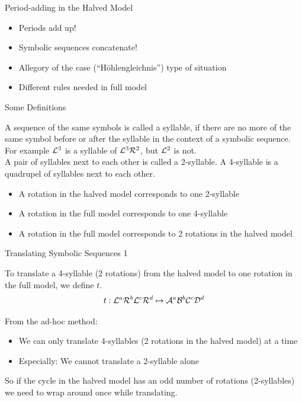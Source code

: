 \begin{frame}{Period-adding in the Halved Model}
	\begin{itemize}
		\item Periods add up!
		\item Symbolic sequences concatenate!
	\end{itemize}
	\pause
	\vspace{3em}
	\begin{itemize}
		\item Allegory of the case (``Höhlengleichnis'') type of situation
		\item Different rules needed in full model
	\end{itemize}
\end{frame}

\begin{frame}{Some Definitions}
	\vspace{-1em}
	\begin{definition}[Syllables]
		A sequence of the same symbols is called a syllable, if there are no more of the same symbol before or after the syllable in the context of a symbolic sequence. \\
		For example $\mathcal{L}^3$ is a syllable of $\mathcal{L}^3\mathcal{R}^2$, but $\mathcal{L}^2$ is not. \\[1em]
		A pair of syllables next to each other is called a 2-syllable.
		A 4-syllable is a quadrupel of syllables next to each other.
	\end{definition}
	\begin{itemize}
		\pause
		\item A rotation in the halved model corresponds to one 2-syllable \pause
		\item A rotation in the full model corresponds to one 4-syllable \pause
		\item A rotation in the full model corresponds to 2 rotations in the halved model
	\end{itemize}
\end{frame}

\begin{frame}{Translating Symbolic Sequences 1}
	\begin{definition}
		To translate a 4-syllable (2 rotations) from the halved model to one rotation in the full model, we define $t$.
		\begin{align*}
			t: \mathcal{L}^a\mathcal{R}^b\mathcal{L}^c\mathcal{R}^d \mapsto \mathcal{A}^a\mathcal{B}^b\mathcal{C}^c\mathcal{D}^d
		\end{align*}
	\end{definition}

	\pause
	From the ad-hoc method:
	\pause
	\begin{itemize}
		\item We can only translate 4-syllables (2 rotations in the halved model) at a time \pause
		\item Especially: We cannot translate a 2-syllable alone
	\end{itemize}
	\pause
	So if the cycle in the halved model has an odd number of rotations (2-syllables) we need to wrap around once while translating.
\end{frame}

